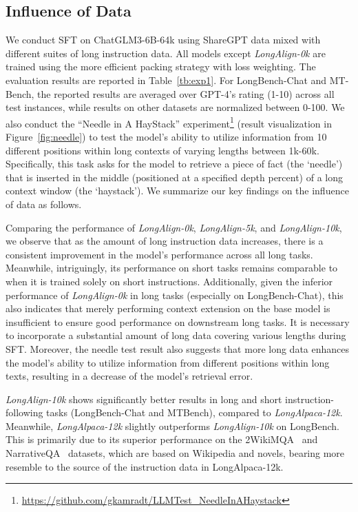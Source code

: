 \subsection{Influence of Data}
We conduct SFT on ChatGLM3-6B-64k using ShareGPT data mixed with different suites of long instruction data. 
All models except \emph{LongAlign-0k} are trained using the more efficient packing strategy with loss weighting.
The evaluation results are reported in Table~\ref{tb:exp1}.
For LongBench-Chat and MT-Bench, the reported results are averaged over GPT-4's rating (1-10) across all test instances, while results on other datasets are normalized between 0-100. 
We also conduct the ``Needle in A HayStack'' experiment\footnote{\hyperlink{https://github.com/gkamradt/LLMTest_NeedleInAHaystack}{https://github.com/gkamradt/LLMTest\_NeedleInAHaystack}} (result visualization in Figure~\ref{fig:needle}) to test the model's ability to utilize information from 10 different positions within long contexts of varying lengths between 1k-60k.
Specifically, this task asks for the model to retrieve a piece of fact (the `needle') that is inserted in the middle (positioned at a specified depth percent) of a long context window (the `haystack').
We summarize our key findings on the influence of data as follows.

Comparing the performance of \emph{LongAlign-0k}, \emph{LongAlign-5k}, and \emph{LongAlign-10k}, we observe that as the amount of long instruction data increases, there is a consistent improvement in the model's performance across all long tasks. Meanwhile, intriguingly, its performance on short tasks remains comparable to when it is trained solely on short instructions.
Additionally, given the inferior performance of \emph{LongAlign-0k} in long tasks (especially on LongBench-Chat), this also indicates that merely performing context extension on the base model is insufficient to ensure good performance on downstream long tasks. It is necessary to incorporate a substantial amount of long data covering various lengths during SFT.
Moreover, the needle test result also suggests that more long data enhances the model's ability to utilize information from different positions within long texts, resulting in a decrease of the model's retrieval error.

\emph{LongAlign-10k} shows significantly better results in long and short instruction-following tasks (LongBench-Chat and MTBench), compared to \emph{LongAlpaca-12k}. Meanwhile, \emph{LongAlpaca-12k} slightly outperforms \emph{LongAlign-10k} on LongBench. This is primarily due to its superior performance on the 2WikiMQA~\cite{ho2020constructing} and NarrativeQA~\cite{kovcisky2018narrativeqa} datasets, which are based on Wikipedia and novels, bearing more resemble to the source of the instruction data in LongAlpaca-12k.

